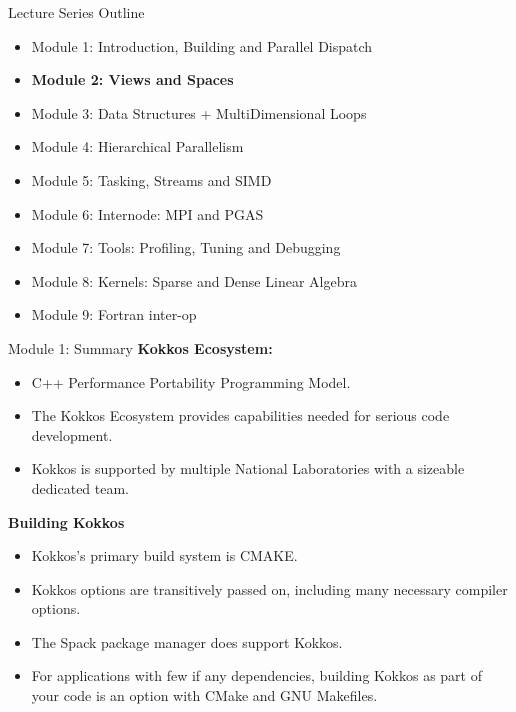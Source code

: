 \begin{frame}{Lecture Series Outline}

\begin{itemize}
        \item Module 1: Introduction, Building and Parallel Dispatch
        \item \textbf{Module 2: Views and Spaces}
        \item Module 3: Data Structures + MultiDimensional Loops
        \item Module 4: Hierarchical Parallelism
        \item Module 5: Tasking, Streams and SIMD
        \item Module 6: Internode: MPI and PGAS
        \item Module 7: Tools: Profiling, Tuning and Debugging
        \item Module 8: Kernels: Sparse and Dense Linear Algebra
        \item Module 9: Fortran inter-op
\end{itemize}
\end{frame}

\begin{frame}{Module 1: Summary}
	\textbf{Kokkos Ecosystem:}
	\begin{itemize}
		\item C++ Performance Portability Programming Model.
		\item The Kokkos Ecosystem provides capabilities needed for serious code development.
		\item Kokkos is supported by multiple National Laboratories with a sizeable dedicated team.
	\end{itemize}

	\textbf{Building Kokkos}
	\begin{itemize}
    \item{Kokkos's primary build system is CMAKE.}
    \item{Kokkos options are transitively passed on, including many necessary compiler options.}
    \item{The Spack package manager does support Kokkos.}
    \item{For applications with few if any dependencies, building Kokkos as part of your code is an option with CMake and GNU Makefiles.}
	\end{itemize}
\end{frame}

